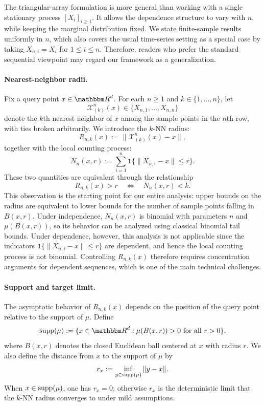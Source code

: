 \documentclass[12pt]{article}
\def\R{{\mathbbm R}}
\theoremstyle{definition}
\begin{document}
The triangular-array formulation is more general than working with a single stationary process $[X_i]_{i\ge1}$. It allows the dependence structure to vary with $n$, while keeping the marginal distribution fixed. We state finite-sample results uniformly in $n$, which also covers the usual time-series setting as a special case by taking $X_{n,i} = X_i$ for $1 \le i \le n$. Therefore, readers who prefer the standard sequential viewpoint may regard our framework as a generalization.

\paragraph*{Nearest-neighbor radii.}
Fix a query point $x \in \R^d$. For each $n \ge 1$ and $k \in \{1,\dots,n\}$, let
\[
\mathcal X_{(k)}^n(x) \in \{X_{n,1},\dots,X_{n,n}\}
\]
denote the $k$th nearest neighbor of $x$ among the sample points in the $n$th row, with ties broken arbitrarily. We introduce the $k$-NN radius:
\[
  R_{n,k}(x) := \|\mathcal X_{(k)}^n(x)-x\|,
\]
together with the local counting process:
\[
  N_n(x,r)
  :=
  \sum_{i=1}^n \mathbf{1}\{\|X_{n,i}-x\| \le r\}.
\]
These two quantities are equivalent through the relationship
\[
R_{n,k}(x) > r
\quad\Longleftrightarrow\quad
N_n(x,r) < k.
\]
This observation is the starting point for our entire analysis: upper bounds on the radius are equivalent to lower bounds for the number of sample points falling in $B(x,r)$. Under independence, $N_n(x,r)$ is binomial with parameters $n$ and $\mu(B(x,r))$, so its behavior can be analyzed using classical binomial tail bounds. Under dependence, however, this analysis is not applicable since the indicators $\mathbf{1}\{\| X_{n,i}-x\| \le r\}$ are dependent, and hence the local counting process is not binomial. Controlling $R_{n,k}(x)$ therefore requires concentration arguments for dependent sequences, which is one of the main technical challenges.

\paragraph*{Support and target limit.}
The asymptotic behavior of $R_{n,k}(x)$ depends on the position of the query point relative to the support of $\mu$. Define
\[
{\rm supp}(\mu)
:=
\{x \in \R^d : \mu(B(x,r)) > 0 \text{ for all } r>0\},
\]
where $B(x,r)$ denotes the closed Euclidean ball centered at $x$ with radius $r$. We also define the distance from $x$ to the support of $\mu$ by
\[
r_x := \inf_{y \in {\rm supp}(\mu)} \| y-x \|.
\]
When $x \in {\rm supp}(\mu)$, one has $r_x=0$; otherwise $r_x$ is the deterministic limit that the $k$-NN radius converges to under mild assumptions.
\end{document}
